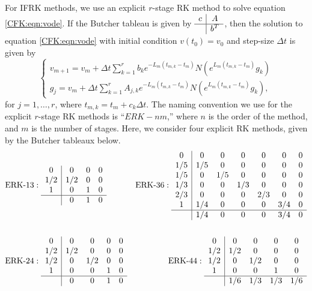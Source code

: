 \documentclass{csri19}
\begin{document}
For IFRK methods, we use an explicit $r$-stage RK method to solve 
equation \ref{CFK:eqn:vode}. If the Butcher tableau is given by 
$\begin{array}{c|c}
c & A \\ \hline & b^T \end{array}$, then the solution to equation \ref{CFK:eqn:vode} 
with initial condition $v(t_0) = v_0$ and step-size $\Delta t$ is given by
\[ \left\{\begin{array}{l} v_{m+1} = v_m + \Delta t\sum_{k=1}^r b_k 
                         e^{-L_m(t_{m,k}-t_m)}N(e^{L_m(t_{m,k}-t_m)}g_k) \\
          g_j = v_m + \Delta t \sum_{k=1}^r A_{j,k} e^{-L_m(t_{m,k} - t_m)} 
                      N(e^{L_m(t_{m,k}-t_m)}g_k), \end{array} \right. \]
for $j = 1,\dots,r$, where $t_{m,k} = t_m + c_k \Delta t$.
The naming convention we use for the explicit $r$-stage RK methods is ``$ERK
-nm$,'' where $n$ is the order of the method, and $m$ is the number of
stages. Here, we consider four explicit RK methods, given by the Butcher 
tableaux below.
\begin{align*}&\text{ERK-}13:
 \begin{array}{c|ccc}
0   & 0   & 0 & 0\\
1/2 & 1/2 & 0 & 0\\
1   & 0   & 1 & 0\\
\hline
    & 0   & 1 & 0
\end{array}
& \text{ERK-}36: 
\begin{array}{c|cccccc}
0   & 0   & 0   & 0   & 0   & 0   & 0\\
1/5 & 1/5 & 0   & 0   & 0   & 0   & 0\\
1/5 & 0   & 1/5 & 0   & 0   & 0   & 0\\
1/3 & 0   & 0   & 1/3 & 0   & 0   & 0\\
2/3 & 0   & 0   & 0   & 2/3 & 0   & 0\\
1   & 1/4 & 0   & 0   & 0   & 3/4 & 0\\
\hline
    & 1/4 & 0   & 0   & 0   & 3/4 & 0
\end{array}\\
\\
&\text{ERK-}24: 
\begin{array}{c|cccc}
0   & 0   & 0   & 0 & 0\\
1/2 & 1/2 & 0   & 0 & 0\\
1/2 & 0   & 1/2 & 0 & 0\\
1   & 0   & 0   & 1 & 0\\
\hline
    & 0   & 0   & 1 & 0
\end{array}
& \text{ERK-}44: 
\begin{array}{c|cccc}
0   & 0   & 0   & 0   & 0 \\
1/2 & 1/2 & 0   & 0   & 0 \\
1/2 & 0   & 1/2 & 0   & 0 \\
1   & 0   & 0   & 1   & 0 \\
\hline
    & 1/6 & 1/3 & 1/3 & 1/6
\end{array} 
\end{align*}
\end{document}
